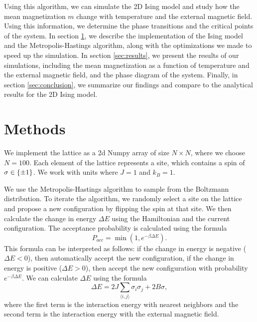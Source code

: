 \documentclass[
 reprint,
 amsmath,
 amssymb,
 aps,
]{revtex4-2}
\begin{document}
Using this algorithm, we can simulate the 2D Ising model and study how
the mean magnetization $ m $ change with temperature and the external magnetic
field. Using this information, we determine the phase transitions
and the critical points of the system.
In section \ref{sec:methods},
we describe the implementation of the Ising model and the Metropolis-Hastings
algorithm, along with the optimizations we made to speed up the simulation.
In section \ref{sec:results}, we present the results of our simulations,
including the mean magnetization as a function of temperature and the
external magnetic field, and the phase diagram of the system.
Finally, in section \ref{sec:conclusion}, we summarize our findings
and compare to the analytical results for the 2D Ising model.


\section{Methods}
\label{sec:methods}

We implement the lattice as a 2d Numpy array of size $ N\times N $,
where we choose $ N = 100 $.
Each element of the lattice represents a site,
which contains a spin of $ \sigma \in \qty{\pm 1} $.
We work with units where $ J = 1 $ and $ k_{B} = 1 $.

We use the Metropolis-Hastings algorithm to sample from the Boltzmann
distribution.
To iterate the algorithm,
we randomly select a site on the lattice and propose a new configuration
by flipping the spin at that site.
We then calculate the change in energy $ \Delta E $ using the Hamiltonian
and the current configuration.
The acceptance probability is calculated using the formula
\begin{equation}
P_{acc} = \min\left(1, e^{-\beta \Delta E}\right).
\end{equation}
This formula can be interpreted as follows:
if the change in energy is negative ($ \Delta E < 0 $),
then automatically accept the new configuration,
if the change in energy is positive ($ \Delta E > 0 $),
then accept the new configuration with probability
$ e^{-\beta \Delta E} $.
We can calculate $ \Delta E $ using the formula
\begin{equation}
\Delta E = 2J \sum_{\langle i,j \rangle} \sigma_{i} \sigma_{j} + 2B \sigma, 
\end{equation}
where the first term is the interaction energy with nearest neighbors
and the second term is the interaction energy with the external magnetic field.
\end{document}
